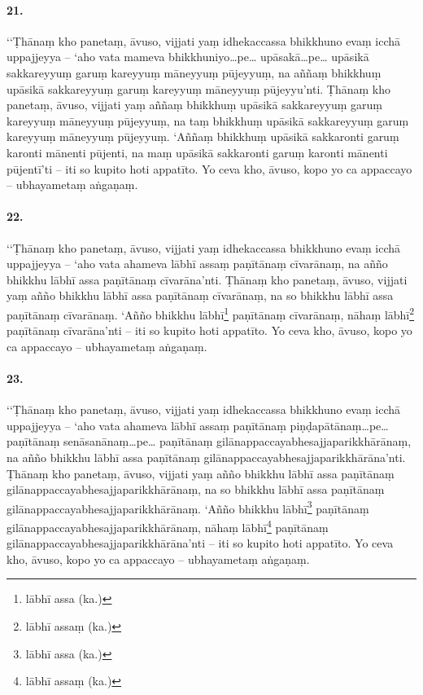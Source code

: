 \paragraph{21.} ‘‘Ṭhānaṃ kho panetaṃ, āvuso, vijjati yaṃ idhekaccassa bhikkhuno evaṃ icchā uppajjeyya – ‘aho vata mameva bhikkhuniyo…pe… upāsakā…pe… upāsikā sakkareyyuṃ garuṃ kareyyuṃ māneyyuṃ pūjeyyuṃ, na aññaṃ bhikkhuṃ upāsikā sakkareyyuṃ garuṃ kareyyuṃ māneyyuṃ pūjeyyu’nti. Ṭhānaṃ kho panetaṃ, āvuso, vijjati yaṃ aññaṃ bhikkhuṃ upāsikā sakkareyyuṃ garuṃ kareyyuṃ māneyyuṃ pūjeyyuṃ, na taṃ bhikkhuṃ upāsikā sakkareyyuṃ garuṃ kareyyuṃ māneyyuṃ pūjeyyuṃ. ‘Aññaṃ bhikkhuṃ upāsikā sakkaronti garuṃ karonti mānenti pūjenti, na maṃ upāsikā sakkaronti garuṃ karonti mānenti pūjentī’ti – iti so kupito hoti appatīto. Yo ceva kho, āvuso, kopo yo ca appaccayo – ubhayametaṃ aṅgaṇaṃ.

\paragraph{22.} ‘‘Ṭhānaṃ kho panetaṃ, āvuso, vijjati yaṃ idhekaccassa bhikkhuno evaṃ icchā uppajjeyya – ‘aho vata ahameva lābhī assaṃ paṇītānaṃ cīvarānaṃ, na añño bhikkhu lābhī assa paṇītānaṃ cīvarāna’nti. Ṭhānaṃ kho panetaṃ, āvuso, vijjati yaṃ añño bhikkhu lābhī assa paṇītānaṃ cīvarānaṃ, na so bhikkhu lābhī assa paṇītānaṃ cīvarānaṃ. ‘Añño bhikkhu lābhī\footnote{lābhī assa (ka.)} paṇītānaṃ cīvarānaṃ, nāhaṃ lābhī\footnote{lābhī assaṃ (ka.)} paṇītānaṃ cīvarāna’nti – iti so kupito hoti appatīto. Yo ceva kho, āvuso, kopo yo ca appaccayo – ubhayametaṃ aṅgaṇaṃ.

\paragraph{23.} ‘‘Ṭhānaṃ kho panetaṃ, āvuso, vijjati yaṃ idhekaccassa bhikkhuno evaṃ icchā uppajjeyya – ‘aho vata ahameva lābhī assaṃ paṇītānaṃ piṇḍapātānaṃ…pe… paṇītānaṃ senāsanānaṃ…pe… paṇītānaṃ gilānappaccayabhesajjaparikkhārānaṃ, na añño bhikkhu lābhī assa paṇītānaṃ gilānappaccayabhesajjaparikkhārāna’nti. Ṭhānaṃ kho panetaṃ, āvuso, vijjati yaṃ añño bhikkhu lābhī assa paṇītānaṃ gilānappaccayabhesajjaparikkhārānaṃ, na so bhikkhu lābhī assa paṇītānaṃ gilānappaccayabhesajjaparikkhārānaṃ. ‘Añño bhikkhu lābhī\footnote{lābhī assa (ka.)} paṇītānaṃ gilānappaccayabhesajjaparikkhārānaṃ, nāhaṃ lābhī\footnote{lābhī assaṃ (ka.)} paṇītānaṃ gilānappaccayabhesajjaparikkhārāna’nti – iti so kupito hoti appatīto. Yo ceva kho, āvuso, kopo yo ca appaccayo – ubhayametaṃ aṅgaṇaṃ.

